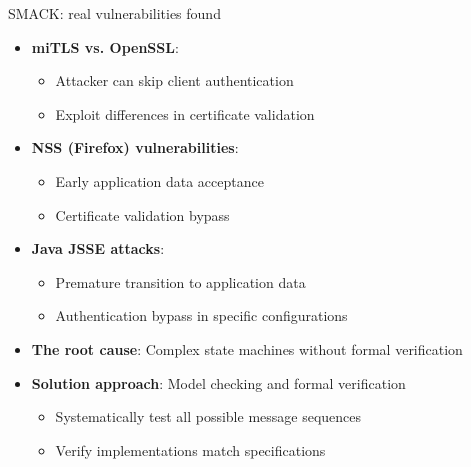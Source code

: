 \ifdefined\PRESENTATION\else\PassOptionsToClass{handout}{beamer}\fi\documentclass[aspectratio=169, lualatex]{beamer}
\begin{document}
\begin{frame}{SMACK: real vulnerabilities found}
	\begin{itemize}[<+->]
		\item \textbf{miTLS vs. OpenSSL}:
		      \begin{itemize}
			      \item Attacker can skip client authentication
			      \item Exploit differences in certificate validation
		      \end{itemize}
		\item \textbf{NSS (Firefox) vulnerabilities}:
		      \begin{itemize}
			      \item Early application data acceptance
			      \item Certificate validation bypass
		      \end{itemize}
		\item \textbf{Java JSSE attacks}:
		      \begin{itemize}
			      \item Premature transition to application data
			      \item Authentication bypass in specific configurations
		      \end{itemize}
		\item \textbf{The root cause}: Complex state machines without formal verification
		\item \textbf{Solution approach}: Model checking and formal verification
		      \begin{itemize}
			      \item Systematically test all possible message sequences
			      \item Verify implementations match specifications
		      \end{itemize}
	\end{itemize}
\end{frame}
\end{document}
